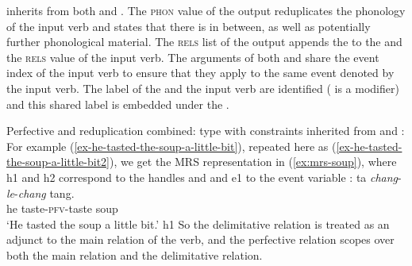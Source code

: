  inherits from both  and .
The \textsc{phon} value of the output reduplicates the phonology of the input verb and states that there is  in between, 
as well as potentially further phonological material.
The \textsc{rels} list of the output appends the  to the  and the \textsc{rels} value of the input verb.
The arguments of both  and  share the event index of the
input verb  to ensure that they apply to the same event denoted by the input verb. 
The label of the  and the input verb are identified ( is a modifier) 
and this shared label is embedded under the .

\ea\label{avm:pfv-redup}
Perfective and reduplication combined: type  with
constraints inherited from  and :
\z
For example (\ref{ex-he-tasted-the-soup-a-little-bit}), repeated here as (\ref{ex-he-tasted-the-soup-a-little-bit2}), we get the  MRS representation in (\ref{ex:mrs-soup}),
where h1 and h2 correspond to the handles  and  and e1 to the event variable :
\ea\label{ex-he-tasted-the-soup-a-little-bit2}
    \gll ta \textit{chang}-\textit{le}-\textit{chang} tang.\\
    he taste-\textsc{pfv}-taste soup\\
    \glt `He tasted the soup a little bit.'
 \z
\ea\label{ex:mrs-soup}
h1 
\z
So the delimitative relation is treated as an adjunct to the main relation of the verb, 
and the perfective relation scopes over both the main relation and the delimitative relation.

